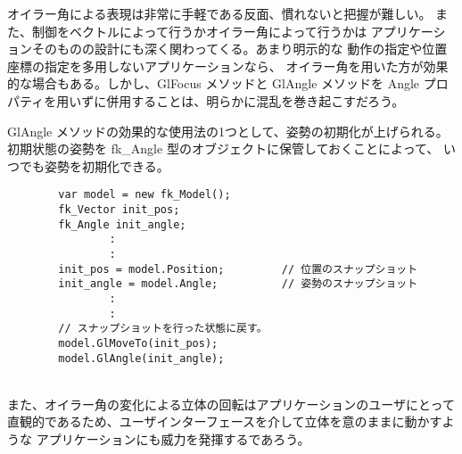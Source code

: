 オイラー角による表現は非常に手軽である反面、慣れないと把握が難しい。
また、制御をベクトルによって行うかオイラー角によって行うかは
アプリケーションそのものの設計にも深く関わってくる。あまり明示的な
動作の指定や位置座標の指定を多用しないアプリケーションなら、
オイラー角を用いた方が効果的な場合もある。しかし、GlFocus メソッドと
GlAngle メソッドを Angle プロパティを用いずに併用することは、明らかに混乱を巻き起こすだろう。

GlAngle メソッドの効果的な使用法の1つとして、姿勢の初期化が上げられる。
初期状態の姿勢を fk\_Angle 型のオブジェクトに保管しておくことによって、
いつでも姿勢を初期化できる。
\\
\begin{breakbox}
\begin{verbatim}
        var model = new fk_Model();
        fk_Vector init_pos;
        fk_Angle init_angle;
                :
                :
        init_pos = model.Position;         // 位置のスナップショット
        init_angle = model.Angle;          // 姿勢のスナップショット
                :
                :
        // スナップショットを行った状態に戻す。
        model.GlMoveTo(init_pos);          
        model.GlAngle(init_angle);
\end{verbatim}
\end{breakbox}
~ \\
また、オイラー角の変化による立体の回転はアプリケーションのユーザにとって
直観的であるため、ユーザインターフェースを介して立体を意のままに動かすような
アプリケーションにも威力を発揮するであろう。

